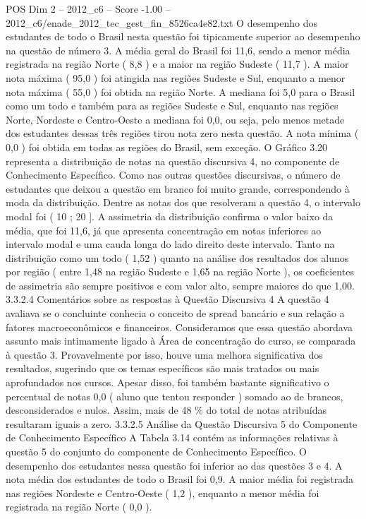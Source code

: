 \begin{textsample}{POS Dim 2 – 2012\_c6 – Score -1.00 – 2012\_c6/enade\_2012\_tec\_gest\_fin\_8526ca4e82.txt}
O desempenho dos estudantes de todo o Brasil nesta questão foi tipicamente superior ao desempenho na questão de número 3.
A média geral do Brasil foi 11,6, sendo a menor média registrada na região Norte ( 8,8 ) e a maior na região Sudeste ( 11,7 ).
A maior nota máxima ( 95,0 ) foi atingida nas regiões Sudeste e Sul, enquanto a menor nota máxima ( 55,0 ) foi obtida na região Norte.
A mediana foi 5,0 para o Brasil como um todo e também para as regiões Sudeste e Sul, enquanto nas regiões Norte, Nordeste e Centro-Oeste a mediana foi 0,0, ou seja, pelo menos metade dos estudantes dessas três regiões tirou nota zero nesta questão.
A nota mínima ( 0,0 ) foi obtida em todas as regiões do Brasil, sem exceção.
O Gráfico 3.20 representa a distribuição de notas na questão discursiva 4, no componente de Conhecimento Específico.
Como nas outras questões discursivas, o número de estudantes que deixou a questão em branco foi muito grande, correspondendo à moda da distribuição.
Dentre as notas dos que resolveram a questão 4, o intervalo modal foi ( 10 ; 20 ].
A assimetria da distribuição confirma o valor baixo da média, que foi 11,6, já que apresenta concentração em notas inferiores ao intervalo modal e uma cauda longa do lado direito deste intervalo.
Tanto na distribuição como um todo ( 1,52 ) quanto na análise dos resultados dos alunos por região ( entre 1,48 na região Sudeste e 1,65 na região Norte ), os coeficientes de assimetria são sempre positivos e com valor alto, sempre maiores do que 1,00. 3.3.2.4 Comentários sobre as respostas à Questão Discursiva 4 A questão 4 avaliava se o concluinte conhecia o conceito de spread bancário e sua relação a fatores macroeconômicos e financeiros.
Consideramos que essa questão abordava assunto mais intimamente ligado à Área de concentração do curso, se comparada à questão 3.
Provavelmente por isso, houve uma melhora significativa dos resultados, sugerindo que os temas específicos são mais tratados ou mais aprofundados nos cursos.
Apesar disso, foi também bastante significativo o percentual de notas 0,0 ( aluno que tentou responder ) somado ao de brancos, desconsiderados e nulos.
Assim, mais de 48 \% do total de notas atribuídas resultaram iguais a zero. 3.3.2.5 Análise da Questão Discursiva 5 do Componente de Conhecimento Específico A Tabela 3.14 contém as informações relativas à questão 5 do conjunto do componente de Conhecimento Específico.
O desempenho dos estudantes nessa questão foi inferior ao das questões 3 e 4.
A nota média dos estudantes de todo o Brasil foi 0,9.
A maior média foi registrada nas regiões Nordeste e Centro-Oeste ( 1,2 ), enquanto a menor média foi registrada na região Norte ( 0,0 ).

\end{textsample}
